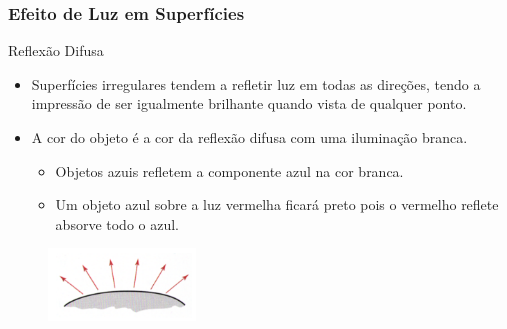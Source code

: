 \documentclass{beamer}
\begin{document}
\begin{frame}
\frametitle{Efeito de Luz em Superfícies}

	\begin{block}{Reflexão Difusa}
		\begin{itemize}
			\item Superfícies irregulares tendem a refletir luz em todas as direções, tendo a impressão de ser igualmente brilhante quando vista de qualquer ponto.
			\item A cor do objeto é a cor da reflexão difusa com uma iluminação branca.
					\begin{itemize}
						\item Objetos azuis refletem a componente azul na cor branca.
						\item Um objeto azul sobre a luz vermelha ficará preto pois o vermelho reflete  absorve todo o azul.
					\end{itemize}							
		
		\end{itemize}
	\end{block}
	
	\begin{figure}[!h]
			\begin{center}
			\includegraphics[width=0.35\textwidth]{Figures/RefDif}
			\end{center}
		\end{figure}	
	
\end{frame}
\end{document}
